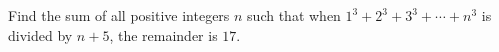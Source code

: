Find the sum of all positive integers $n$ such that when $1^3+2^3+3^3+\cdots+n^3$ is divided by $n+5$, the remainder is $17.$